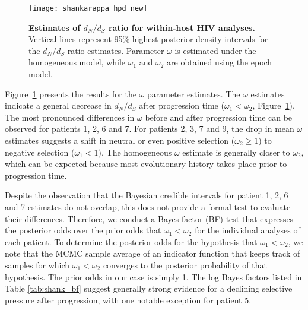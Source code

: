 \begin{figure}[H]
\centering
\texttt{[image: shankarappa\_hpd\_new]} 
\caption{
{ \footnotesize 
{\bf Estimates of $d_N/d_S$ ratio for within-host HIV analyses.} Vertical lines represent 95\% highest posterior density intervals for the $d_N/d_S$ ratio estimates. 
Parameter $\omega$ is estimated under the homogeneous model, while $\omega_{1}$ and $\omega_{2}$ are obtained using the epoch model.
}%
}
\label{fig:shank_hpd}
\end{figure}

Figure~\ref{fig:shank_hpd} presents the results for the $\omega$ parameter estimates. 
The $\omega$ estimates indicate a general decrease in $d_N/d_S$ after progression time ($\omega_{1} < \omega_{2}$, Figure~\ref{fig:shank_hpd}).
The most pronounced differences in $\omega$ before and after progression time can be observed for patients 1, 2, 6 and 7.
For patients 2, 3, 7 and 9, the drop in mean $\omega$ estimates suggests a shift in neutral or even positive selection ($\omega_{2} \geq 1$) to negative selection ($\omega_{1} < 1 $).
The homogeneous $\omega$ estimate is generally closer to $\omega_{2}$, which can be expected because most evolutionary history takes place prior to progression time. 

Despite the observation that the Bayesian credible intervals for patient 1, 2, 6 and 7 estimates do not overlap, this does not provide a formal test to evaluate their differences.
Therefore, we conduct a Bayes factor (BF) test \citep{Suchard2005} that expresses the posterior odds over the prior odds that $\omega_{1} < \omega_{2}$ for the individual analyses of each patient.
To determine the posterior odds for the hypothesis that $\omega_{1} < \omega_{2}$, we note that the MCMC sample average of an indicator function that keeps track of samples for which $\omega_{1} < \omega_{2}$ converges to the posterior probability of that hypothesis.
The prior odds in our case is simply 1.
The log Bayes factors listed in Table \ref{tab:shank_bf} suggest generally strong evidence for a declining selective pressure after progression, with one notable exception for patient 5.

